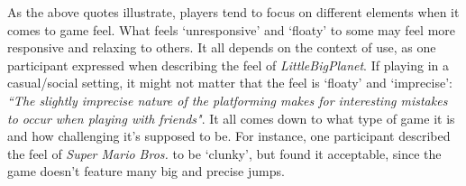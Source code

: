 As the above quotes illustrate, players tend to focus on different elements when it comes to game feel. What feels `unresponsive' and `floaty' to some may feel more responsive and relaxing to others. It all depends on the context of use, as one participant expressed when describing the feel of \textit{LittleBigPlanet}. If playing in a casual/social setting, it might not matter that the feel is `floaty' and `imprecise': \textit{``The slightly imprecise nature of the platforming makes for interesting mistakes to occur when playing with friends"}. It all comes down to what type of game it is and how challenging it's supposed to be. For instance, one participant described the feel of \textit{Super Mario Bros.} to be `clunky', but found it acceptable, since the game doesn't feature many big and precise jumps.